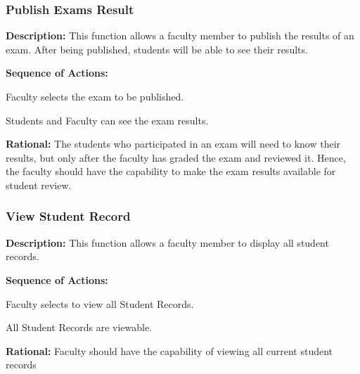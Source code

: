    \subsubsection{\large Publish Exams Result} 
   \begin{boxed} %
      \textbf{Description:}
      {\small This function allows a faculty member to publish the results of an
         exam. After being published, students will be able to see their
         results.}
         
         \textbf{Sequence of Actions:}
         \begin{enumerate}
               {\small
            \item Faculty selects the exam to be published.
            \item Students and Faculty can see the exam results.}
      \end{enumerate}

         \textbf{Rational:}
         {\small The students who participated in an exam will need to know their
         results, but only after the faculty has graded the exam and reviewed
         it. Hence, the faculty should have the capability to make the exam
         results available for student review.}
   \end{boxed} %

   \subsubsection{\large View Student Record} 
   \begin{boxed} %
      \textbf{Description:}
      {\small This function allows a faculty member to display all student
         records.}
         
         \textbf{Sequence of Actions:}
         \begin{enumerate}
               {\small
            \item Faculty selects to view all Student Records.
            \item All Student Records are viewable.}
      \end{enumerate}

         \textbf{Rational:}
         {\small Faculty should have the capability of viewing all current student
         records}
   \end{boxed} %

